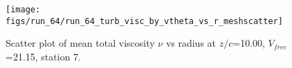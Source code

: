 \begin{figure}[H]
\centering
\texttt{[image: figs/run\_64/run\_64\_turb\_visc\_by\_vtheta\_vs\_r\_meshscatter]}
\caption{Scatter plot of mean total viscosity $\nu$ vs radius at $z/c$=10.00, $V_{free}$=21.15, station 7.}
\label{fig:run_64_turb_visc_by_vtheta_vs_r_meshscatter}
\end{figure}


